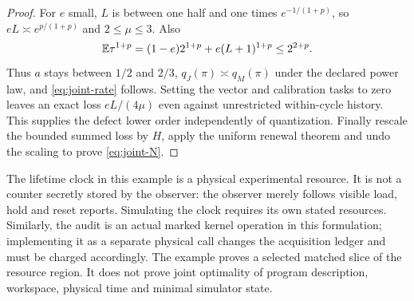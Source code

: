 \begin{proof}
For $e$ small, $L$ is between one half and one times $e^{-1/(1+p)}$, so $eL\asymp e^{p/(1+p)}$ and $2\le\mu\le3$. Also
\[
 \mathbb E\tau^{1+p}=(1-e)2^{1+p}+e(L+1)^{1+p}\le 2^{2+p}.
\]
Thus $a$ stays between $1/2$ and $2/3$, $q_J(\pi)\asymp q_M(\pi)$ under the declared power law, and \eqref{eq:joint-rate} follows. Setting the vector and calibration tasks to zero leaves an exact loss $eL/(4\mu)$ even against unrestricted within-cycle history. This supplies the defect lower order independently of quantization. Finally rescale the bounded summed loss by $H$, apply the uniform renewal theorem and undo the scaling to prove \eqref{eq:joint-N}.
\end{proof}

The lifetime clock in this example is a physical experimental resource. It is not a counter secretly stored by the observer: the observer merely follows visible load, hold and reset reports. Simulating the clock requires its own stated resources. Similarly, the audit is an actual marked kernel operation in this formulation; implementing it as a separate physical call changes the acquisition ledger and must be charged accordingly. The example proves a selected matched slice of the resource region. It does not prove joint optimality of program description, workspace, physical time and minimal simulator state.

